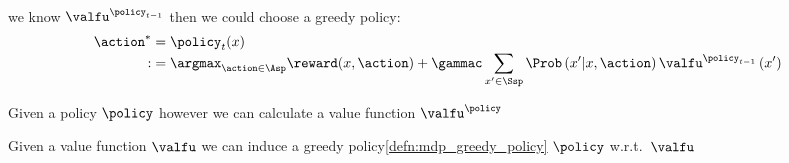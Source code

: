 \begin{defnbox}\nospacing
  \begin{defn}\label{defn:mdp_greedy_policy}\leavevmode\\
     we know $\valfu^{\policy_{t-1}}$ then we could choose a greedy policy:
    \begin{align}
      \action^{*}&=\policy_{t}(x)\\[-1\jot]
      :&=\argmax_{\action\in\Asp}\reward(x,\action)+\gammac\sum_{x'\in\Ssp}\Prob\left(x'|x,\action\right)\valfu^{\policy_{t-1}}\left(x'\right)\nonumber
    \end{align}
  \end{defn}
\end{defnbox}
\begin{sectionbox}\nospacing
  \begin{circlelistnosep}
	\item Given a policy $\policy$ however we can calculate a value function $\valfu^{\policy}$
    \item Given a value function $\valfu$ we can induce a greedy policy\cref{defn:mdp_greedy_policy} $\policy$ w.r.t.\ $\valfu$
  \end{circlelistnosep}
  \vspace{-10pt}
    \begin{figure}[H]
    \centering
\end{figure}
\end{sectionbox}
